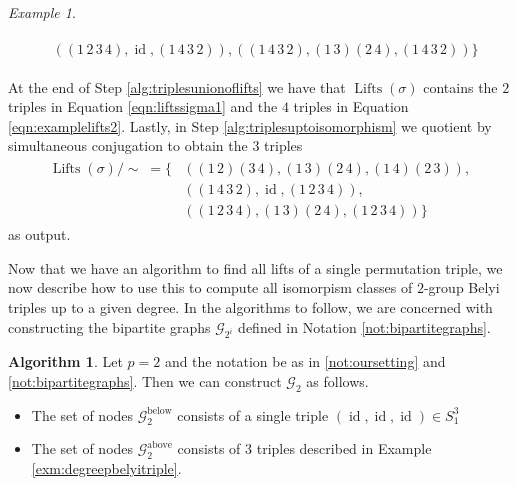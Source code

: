\documentclass{dcthesis}
\DeclareMathOperator{\Lifts}{Lifts}
\DeclareMathOperator{\id}{id}
\numberwithin{equation}{section}
\theoremstyle{definition}
\newtheorem{alg}[equation]{Algorithm}
\theoremstyle{remark}
\newtheorem{example}[equation]{Example}
\begin{document}
{{\begin{example}
\begin{itemize}
\begin{align}
\begin{split}
            &((1\,2\,3\,4), \id, (1\,4\,3\,2)),
              ((1\,4\,3\,2), (1\,3)(2\,4), (1\,4\,3\,2))
            \Big\}
            \end{split}
          \end{align}
      \end{itemize}
      At the end of
      Step \ref{alg:triplesunionoflifts}
      we have that
      $\Lifts(\sigma)$
      contains the $2$ triples in
      Equation \ref{eqn:liftssigma1}
      and the $4$ triples in
      Equation \ref{eqn:examplelifts2}.
      Lastly, in Step
      \ref{alg:triplesuptoisomorphism}
      we quotient by simultaneous conjugation
      to obtain the $3$ triples
      \begin{align}
        \label{eqn:exampleoutput}
        \begin{split}
          \Lifts(\sigma)/\!\!\sim
          \;=\Big\{
            &((1\,2)(3\,4),(1\,3)(2\,4),(1\,4)(2\,3)),\\
            &((1\,4\,3\,2),\id,(1\,2\,3\,4)),\\
            &((1\,2\,3\,4),(1\,3)(2\,4),(1\,2\,3\,4))
          \Big\}
        \end{split}
      \end{align}
      as output.
    \end{example}
    Now that we have an algorithm to
    find all lifts of a single
    permutation triple,
    we now describe how to use this
    to compute all isomorpism classes
    of $2$-group Belyi triples
    up to a given degree.
    In the algorithms to follow,
    we are concerned with constructing
    the bipartite graphs
    $\mathscr{G}_{2^i}$
    defined in
    Notation \ref{not:bipartitegraphs}.
    \begin{alg}
      \label{alg:alltriplesbasecase}
      Let $p=2$ and the notation be as in
      \ref{not:oursetting} and
      \ref{not:bipartitegraphs}.
      Then we can construct
      $\mathscr{G}_2$ as follows.
      \begin{itemize}
        \item
          \label{alg:alltriplesbasecasebelow}
          The set of nodes
          $\mathscr{G}_2^\text{below}$
          consists of a single triple
          $(\id,\id,\id)\in S_1^3$
        \item
          \label{alg:alltriplesbasecaseabove}
          The set of nodes
          $\mathscr{G}_2^\text{above}$
          consists of $3$ triples
          described in
          Example
          \ref{exm:degreepbelyitriple}.

\end{itemize}
\end{alg}}}
\end{document}
